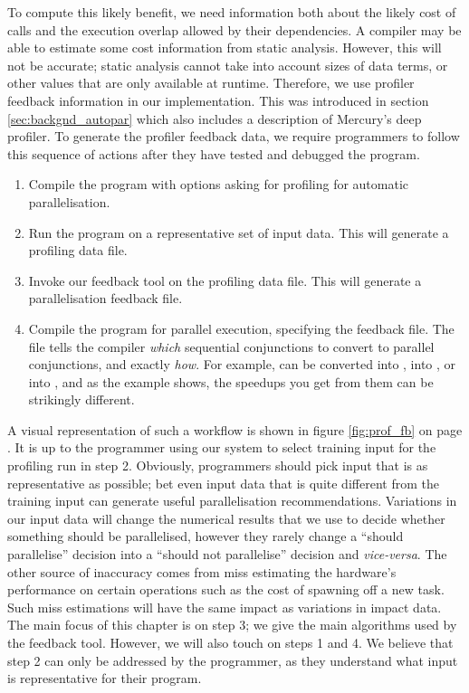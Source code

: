 To compute this likely benefit,
we need information
both about the likely cost of calls
and the execution overlap allowed by their dependencies.
A compiler may be able to estimate some cost information from static
analysis.
However, this will not be accurate;
static analysis cannot take into account sizes of data terms,
or other values that are only available at runtime.
Therefore, we use profiler feedback information in our implementation.
This was introduced in section \ref{sec:backgnd_autopar}
which also includes a description of Mercury's deep profiler.
To generate the profiler feedback data,
we require programmers to follow this sequence of actions after they have
tested and debugged the program.

\begin{enumerate}
\item
Compile the program
with options asking for profiling
for automatic parallelisation.
\item
Run the program on a representative set of input data.
This will generate a profiling data file.
\item
Invoke our feedback tool on the profiling data file.
This will generate a parallelisation feedback file.
\item
Compile the program for parallel execution,
specifying the feedback file.
The file tells the compiler
\emph{which} sequential conjunctions to convert to parallel conjunctions,
and exactly \emph{how}.
For example,  can be converted
into ,
into , or
into ,
and as the  example shows,
the speedups you get from them can be strikingly different.
\end{enumerate}

\noindent
A visual representation of such a workflow is shown in figure
\ref{fig:prof_fb} on page \pageref{fig:prof_fb}.
It is up to the programmer using our system
to select training input for the profiling run in step 2.
Obviously, programmers should pick input that is as representative as
possible;
bet even input data that is quite different from the training input can
generate useful parallelisation recommendations.
Variations in our input data will change the numerical results
that we use to decide whether something should be parallelised,
however they rarely change a ``should parallelise'' decision into a
``should not parallelise'' decision and \emph{vice-versa}.
The other source of inaccuracy comes from miss estimating the hardware's
performance on certain operations such as the cost of spawning off a new
task.
Such miss estimations will have the same impact as variations in impact data.
The main focus of this chapter is on step 3;
we give the main algorithms used by the feedback tool.
However, we will also touch on steps 1 and 4.
We believe that step 2 can only be addressed by the programmer,
as they understand what input is representative for their program.

